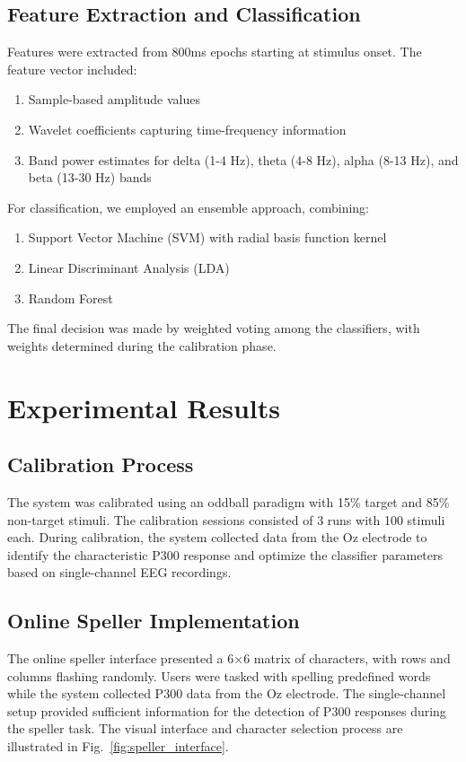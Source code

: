 \documentclass[conference]{IEEEtran}
\begin{document}
\subsection{Feature Extraction and Classification}
Features were extracted from 800ms epochs starting at stimulus onset. The feature vector included:
\begin{enumerate}
\item Sample-based amplitude values
\item Wavelet coefficients capturing time-frequency information
\item Band power estimates for delta (1-4 Hz), theta (4-8 Hz), alpha (8-13 Hz), and beta (13-30 Hz) bands
\end{enumerate}

For classification, we employed an ensemble approach, combining:
\begin{enumerate}
\item Support Vector Machine (SVM) with radial basis function kernel
\item Linear Discriminant Analysis (LDA)
\item Random Forest
\end{enumerate}

The final decision was made by weighted voting among the classifiers, with weights determined during the calibration phase.

\section{Experimental Results}

\subsection{Calibration Process}
The system was calibrated using an oddball paradigm with 15\% target and 85\% non-target stimuli. The calibration sessions consisted of 3 runs with 100 stimuli each. During calibration, the system collected data from the Oz electrode to identify the characteristic P300 response and optimize the classifier parameters based on single-channel EEG recordings.


\subsection{Online Speller Implementation}
The online speller interface presented a 6×6 matrix of characters, with rows and columns flashing randomly. Users were tasked with spelling predefined words while the system collected P300 data from the Oz electrode. The single-channel setup provided sufficient information for the detection of P300 responses during the speller task. The visual interface and character selection process are illustrated in Fig.~\ref{fig:speller_interface}.
\end{document}
